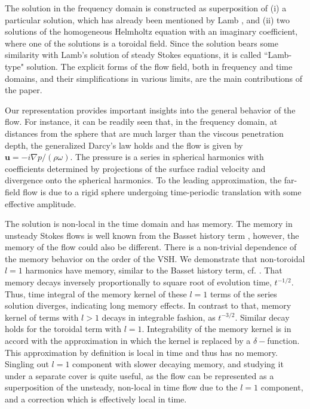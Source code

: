 \documentclass[aps,prx,twocolumn,amsmath,amssymb,amsfonts]{revtex4-2}
\begin{document}
{{The solution in the frequency domain is constructed as superposition of (i) a particular solution, which has already been mentioned by Lamb \cite{Lamb}, and (ii) two solutions of the homogeneous Helmholtz equation with an imaginary coefficient, where one of the solutions is a toroidal field. Since the solution bears some similarity with Lamb's solution of steady Stokes equations, it is called ``Lamb-type" solution. The explicit forms of the flow field, both in frequency and time domains, and their simplifications in various limits, are the main contributions of the paper.

Our representation provides important insights into the general behavior of the flow. For instance, it can be readily seen that, in the frequency domain, at distances from the sphere that are much larger than the viscous penetration depth, the generalized Darcy's law holds and the flow is given by $\bm u=-i\nabla p/(\rho\omega)$. The pressure is a series in spherical harmonics with coefficients determined by projections of the surface radial velocity and divergence onto the spherical harmonics. To the leading approximation, the far-field flow is due to a rigid sphere undergoing time-periodic translation with some effective amplitude.

The solution is non-local in the time domain and has memory. The memory in unsteady Stokes flows is well known from the Basset history term \cite{kim}, however, the memory of the flow could also be different. There is a non-trivial dependence of the memory behavior on the order of the VSH. We demonstrate that non-toroidal $l\!=\!1$ harmonics have memory, similar to the Basset history term, cf. \cite{Ishimoto}. That memory decays inversely proportionally to square root of evolution time, $t^{-1/2}$. Thus, time integral of the memory kernel of these $l=1$ terms of the series solution diverges, indicating long memory effects. In contrast to that, memory kernel of terms with $l>1$ decays in integrable fashion, as $t^{-3/2}$. Similar decay holds for the toroidal term with $l=1$. Integrability of the memory kernel is in accord with the approximation in which the kernel is replaced by a $\delta-$function. This approximation by definition is local in time and thus has no memory. Singling out $l\!=\!1$ component with slower decaying memory, and studying it under a separate cover is quite useful, as the flow can be represented as a superposition of  the unsteady, non-local in time flow due to the $l\!=\!1$ component, and a correction which is effectively local in time.

}}
\end{document}
